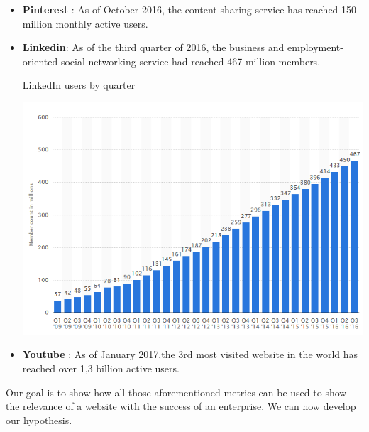 \documentclass{article}
\begin{document}
\begin{itemize}
\begin{table}[H]
\begin{center}
\end{center}
\end{table}
\item \textbf{Pinterest} : As of October 2016, the content sharing service has reached 150 million monthly active users.\cite{key47}
\item\textbf{Linkedin}: As of the third quarter of 2016, the business and employment-oriented social networking service had reached 467 million members.\cite{key31}
\begin{table}[H]
\centering
\caption{LinkedIn users by quarter}
\begin{center}
\includegraphics[scale=0.5]{../R/photos/linkedin_q_users.png}   
\end{center}
\end{table}
\item\textbf{Youtube} : As of January 2017,the 3rd most visited website in the world has reached over 1,3 billion active users.\cite{key32}
\end{itemize}
Our goal is to show how all those aforementioned metrics can be used to show the relevance of a website with the success of an enterprise. We can now develop our hypothesis. 
\newpage
\end{document}
